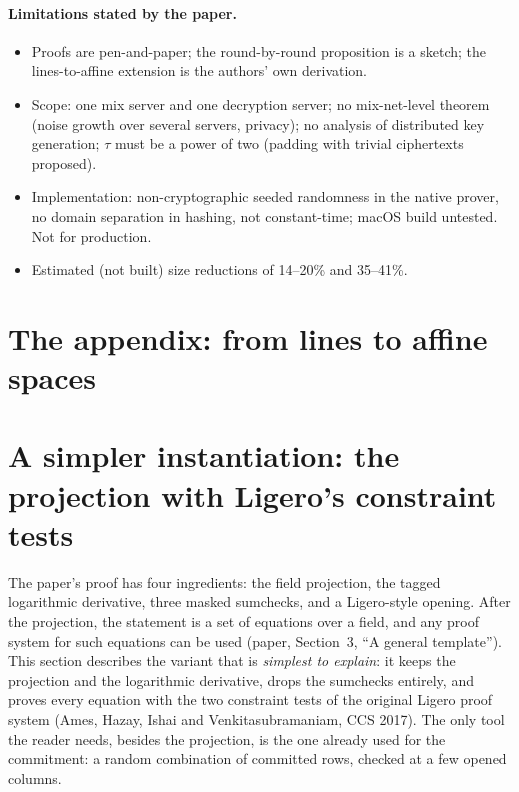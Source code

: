 \documentclass[11pt,a4paper]{article}
\theoremstyle{definition}
\theoremstyle{plain}
\begin{document}
\paragraph{Limitations stated by the paper.}
\begin{itemize}[leftmargin=1.3em]
\item Proofs are pen-and-paper; the round-by-round proposition is a sketch; the lines-to-affine extension is
  the authors' own derivation.
\item Scope: one mix server and one decryption server; no mix-net-level theorem (noise growth over several
  servers, privacy); no analysis of distributed key generation; $\tau$ must be a power of two (padding with
  trivial ciphertexts proposed).
\item Implementation: non-cryptographic seeded randomness in the native prover, no domain separation in
  hashing, not constant-time; macOS build untested. Not for production.
\item Estimated (not built) size reductions of 14--20\% and 35--41\%.
\end{itemize}

\section{The appendix: from lines to affine spaces}
\label{sec:appendix}
\section{A simpler instantiation: the projection with Ligero's constraint tests}
\label{sec:simple}

The paper's proof has four ingredients: the field projection, the tagged logarithmic derivative,
three masked sumchecks, and a Ligero-style opening. After the projection, the statement is a set of
equations over a field, and any proof system for such equations can be used (paper, Section~3,
``A general template''). This section describes the variant that is \emph{simplest to explain}: it
keeps the projection and the logarithmic derivative, drops the sumchecks entirely, and proves every
equation with the two constraint tests of the original Ligero proof system (Ames, Hazay, Ishai and
Venkitasubramaniam, CCS 2017). The only tool the reader needs, besides the projection, is the one
already used for the commitment: a random combination of committed rows, checked at a few opened
columns.
\end{document}
